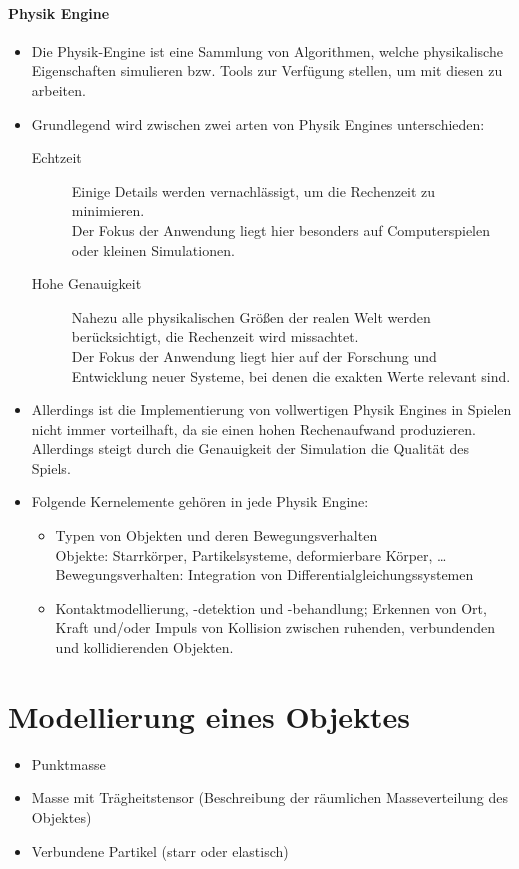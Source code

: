 		\paragraph{Physik Engine}
			\begin{itemize}
				\item Die Physik-Engine ist eine Sammlung von Algorithmen, welche physikalische Eigenschaften simulieren bzw. Tools zur Verfügung stellen, um mit diesen zu arbeiten.
				\item Grundlegend wird zwischen zwei arten von Physik Engines unterschieden:
					\begin{description}
						\item[Echtzeit] Einige Details werden vernachlässigt, um die Rechenzeit zu minimieren. \\ Der Fokus der Anwendung liegt hier besonders auf Computerspielen oder kleinen Simulationen.
						\item[Hohe Genauigkeit] Nahezu alle physikalischen Größen der realen Welt werden berücksichtigt, die Rechenzeit wird missachtet. \\ Der Fokus der Anwendung liegt hier auf der Forschung und Entwicklung neuer Systeme, bei denen die exakten Werte relevant sind.
					\end{description}
				\item Allerdings ist die Implementierung von vollwertigen Physik Engines in Spielen nicht immer vorteilhaft, da sie einen hohen Rechenaufwand produzieren. Allerdings steigt durch die Genauigkeit der Simulation die Qualität des Spiels.
				\item Folgende Kernelemente gehören in jede Physik Engine:
					\begin{itemize}
						\item Typen von Objekten und deren Bewegungsverhalten \\
							Objekte: Starrkörper, Partikelsysteme, deformierbare Körper, \dots \\
							Bewegungsverhalten: Integration von Differentialgleichungssystemen
						\item Kontaktmodellierung, -detektion und -behandlung; Erkennen von Ort, Kraft und/oder Impuls von Kollision zwischen ruhenden, verbundenden und kollidierenden Objekten.
					\end{itemize}
			\end{itemize}

	\section{Modellierung eines Objektes} %
		\begin{itemize}
			\item Punktmasse
			\item Masse mit Trägheitstensor (Beschreibung der räumlichen Masseverteilung des Objektes)
			\item Verbundene Partikel (starr oder elastisch)
		\end{itemize}

